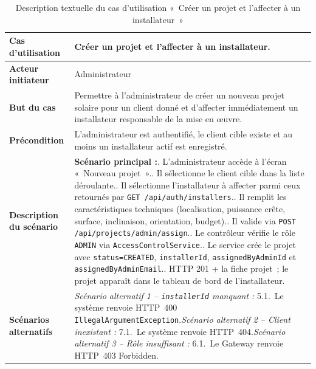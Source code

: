 \begin{table}[H]
  \caption{Description textuelle du cas d'utilisation «~Créer un projet et l'affecter à un installateur~»}
  \label{tab:cu-creer-projet}
  \centering
  \begin{tabularx}{\textwidth}{|L{3.8cm}|X|}
    \hline
    \textbf{Cas d'utilisation} & Créer un projet et l'affecter à un installateur. \\
    \hline
    \textbf{Acteur initiateur} & Administrateur \\
    \hline
    \textbf{But du cas} & Permettre à l'administrateur de créer un nouveau projet solaire pour un client donné et d'affecter immédiatement un installateur responsable de la mise en œuvre. \\
    \hline
    \textbf{Précondition} & L'administrateur est authentifié, le client cible existe et au moins un installateur actif est enregistré. \\
    \hline
    \textbf{Description du scénario} &
    \textbf{Scénario principal :}. L'administrateur accède à l'écran «~Nouveau projet~».. Il sélectionne le client cible dans la liste déroulante.. Il sélectionne l'installateur à affecter parmi ceux retournés par \texttt{GET /api/auth/installers}.. Il remplit les caractéristiques techniques (localisation, puissance crête, surface, inclinaison, orientation, budget).. Il valide via \texttt{POST /api/projects/admin/assign}.. Le contrôleur vérifie le rôle \texttt{ADMIN} via \texttt{AccessControlService}.. Le service crée le projet avec \texttt{status=CREATED}, \texttt{installerId}, \texttt{assignedByAdminId} et \texttt{assignedByAdminEmail}.. HTTP 201 + la fiche projet~; le projet apparaît dans le tableau de bord de l'installateur.\\
    \hline
    \textbf{Scénarios alternatifs} &
    \textit{Scénario alternatif 1 -- \texttt{installerId} manquant :}\newline
    \hspace*{6pt}5.1.~Le système renvoie HTTP~400 \texttt{IllegalArgumentException}.\newline[2pt]
    \textit{Scénario alternatif 2 -- Client inexistant :}\newline
    \hspace*{6pt}7.1.~Le système renvoie HTTP~404.\newline[2pt]
    \textit{Scénario alternatif 3 -- Rôle insuffisant :}\newline
    \hspace*{6pt}6.1.~Le Gateway renvoie HTTP~403 Forbidden.\\
    \hline
  \end{tabularx}
\end{table}

